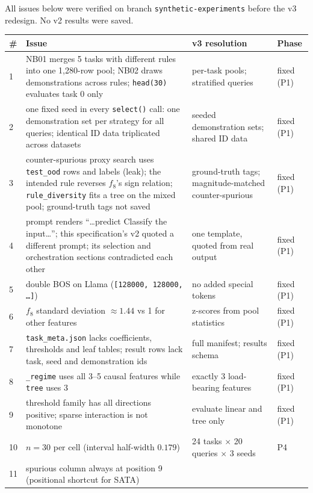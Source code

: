 \documentclass[11pt,a4paper]{article}
\newcommand{\1}{\mathbf{1}}
\theoremstyle{plain}
\theoremstyle{definition}
\theoremstyle{remark}
\begin{document}
All issues below were verified on branch \texttt{synthetic-experiments}
before the v3 redesign. No v2 results were saved.

\begin{center}
\begin{tabular}{L{0.5cm}L{8.9cm}L{4.3cm}L{1.2cm}}
\toprule
\textbf{\#} & \textbf{Issue} & \textbf{v3 resolution} & \textbf{Phase} \\
 & NB01 merges 5 tasks with different rules into one 1{,}280-row pool;
NB02 draws demonstrations across rules; \texttt{head(30)} evaluates task 0
only & per-task pools; stratified queries & fixed (P1) \\
2 & one fixed seed in every \texttt{select()} call: one demonstration set per
strategy for all queries; identical ID data triplicated across datasets &
seeded demonstration sets; shared ID data & fixed (P1) \\
3 & counter-spurious proxy search uses \texttt{test\_ood} rows and labels
(leak); the intended rule reverses $f_8$'s sign relation;
\texttt{rule\_diversity} fits a tree on the mixed pool; ground-truth tags not
saved & ground-truth tags; magnitude-matched counter-spurious & fixed (P1) \\
4 & prompt renders ``\ldots predict Classify the input\ldots''; this
specification's v2 quoted a different prompt; its selection and
orchestration sections contradicted each other & one template, quoted from
real output & fixed (P1) \\
5 & double BOS on Llama (\texttt{[128000, 128000, \ldots]}) & no added special
tokens & fixed (P1) \\
6 & $f_8$ standard deviation $\approx 1.44$ vs 1 for other features &
z-scores from pool statistics & fixed (P1) \\
7 & \texttt{task\_meta.json} lacks coefficients, thresholds and leaf tables;
result rows lack task, seed and demonstration ids & full manifest; results
schema & fixed (P1) \\
8 & \texttt{\_regime} uses all 3--5 causal features while \texttt{tree} uses
3 & exactly 3 load-bearing features & fixed (P1) \\
9 & threshold family has all directions positive; sparse interaction is not
monotone & evaluate linear and tree only & fixed (P1) \\
10 & $n = 30$ per cell (interval half-width $0.179$) & 24 tasks $\times$ 20
queries $\times$ 3 seeds & P4 \\
11 & spurious column always at position 9 (positional shortcut for SATA) &

\end{tabular}
\end{center}
\end{document}

